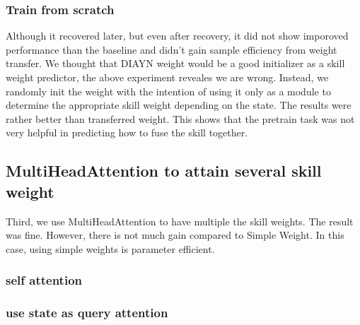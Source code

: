 \subsubsection{Train from scratch}
Although it recovered later, but even after recovery, it did not show imporoved performance than the baseline and didn't gain sample efficiency from weight transfer.
We thought that DIAYN weight would be a good initializer as a skill weight predictor, the above experiment reveales we are wrong.
Instead, we randomly init the weight with the intention of using it only as a module to determine the appropriate skill weight depending on the state.
The results were rather better than transferred weight.
This shows that the pretrain task was not very helpful in predicting how to fuse the skill together.




\subsection{MultiHeadAttention to attain several skill weight}
Third, we use MultiHeadAttention to have multiple the skill weights.
The result was fine.
However, there is not much gain compared to Simple Weight.
In this case, using simple weights is parameter efficient.

\subsubsection{self attention}
\subsubsection{use state as query attention}





